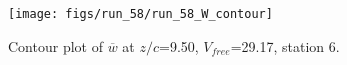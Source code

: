 \begin{figure}[H]
\centering
\texttt{[image: figs/run\_58/run\_58\_W\_contour]}
\caption{Contour plot of $\overline{w}$ at $z/c$=9.50, $V_{free}$=29.17, station 6.}
\label{fig:run_58_W_contour}
\end{figure}


